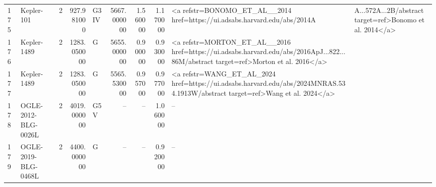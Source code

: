 \begin{tabular}{llrrlrrrl}
175 & Kepler-101 & 2 & 927.981000 & G3 IV & 5667.000000 & 1.560000 & 1.170000 & <a refstr=BONOMO_ET_AL__2014 href=https://ui.adsabs.harvard.edu/abs/2014A&A...572A...2B/abstract target=ref>Bonomo et al. 2014</a> \\
176 & Kepler-1489 & 2 & 1283.050000 & G & 5655.000000 & 0.900000 & 0.930000 & <a refstr=MORTON_ET_AL__2016 href=https://ui.adsabs.harvard.edu/abs/2016ApJ...822...86M/abstract target=ref>Morton et al. 2016</a> \\
177 & Kepler-1489 & 2 & 1283.050000 & G & 5565.530000 & 0.957000 & 0.977000 & <a refstr=WANG_ET_AL_2024 href=https://ui.adsabs.harvard.edu/abs/2024MNRAS.534.1913W/abstract target=ref>Wang et al. 2024</a> \\
178 & OGLE-2012-BLG-0026L & 2 & 4019.000000 & G5 V & -- & -- & 1.060000 & -- \\
179 & OGLE-2019-BLG-0468L & 2 & 4400.000000 & G & -- & -- & 0.920000 & -- \\
\end{tabular}
